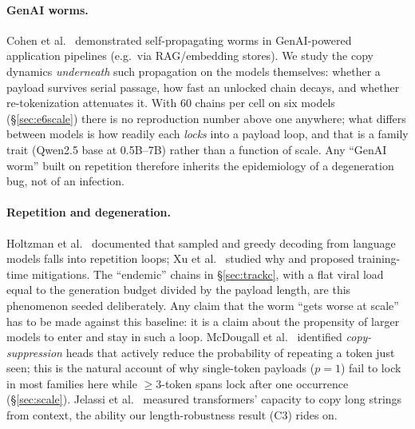 \documentclass[11pt]{article}
\theoremstyle{plain}
\theoremstyle{definition}
\theoremstyle{remark}
\begin{document}
\paragraph{GenAI worms.} Cohen et al.~\cite{cohen2024} demonstrated self-propagating worms in
GenAI-powered application pipelines (e.g.\ via RAG/embedding stores). We study the copy dynamics
\emph{underneath} such propagation on the models themselves: whether a payload survives serial
passage, how fast an unlocked chain decays, and whether re-tokenization attenuates it. With 60
chains per cell on six models (\S\ref{sec:e6scale}) there is no reproduction number above one
anywhere; what differs between models is how readily each \emph{locks} into a payload loop,
and that is a family trait (Qwen2.5 base at 0.5B--7B) rather than a function of scale. Any
``GenAI worm'' built on repetition therefore inherits the epidemiology of a degeneration bug,
not of an infection.

\paragraph{Repetition and degeneration.} Holtzman et al.~\cite{holtzman2019} documented that
sampled and greedy decoding from language models falls into repetition loops; Xu et
al.~\cite{xu2022} studied why and proposed training-time mitigations. The ``endemic'' chains in
\S\ref{sec:trackc}, with a flat viral load equal to the generation budget divided by the payload
length, are this phenomenon seeded deliberately. Any claim that the worm ``gets worse at scale''
has to be made against this baseline: it is a claim about the propensity of larger models to
enter and stay in such a loop. McDougall et al.~\cite{mcdougall2023} identified
\emph{copy-suppression} heads that actively reduce the probability of repeating a token just
seen; this is the natural account of why single-token payloads ($p{=}1$) fail to lock in most
families here while $\ge3$-token spans lock after one occurrence (\S\ref{sec:scale}). Jelassi
et al.~\cite{jelassi2024} measured transformers' capacity to copy long strings from context,
the ability our length-robustness result (C3) rides on.
\end{document}
